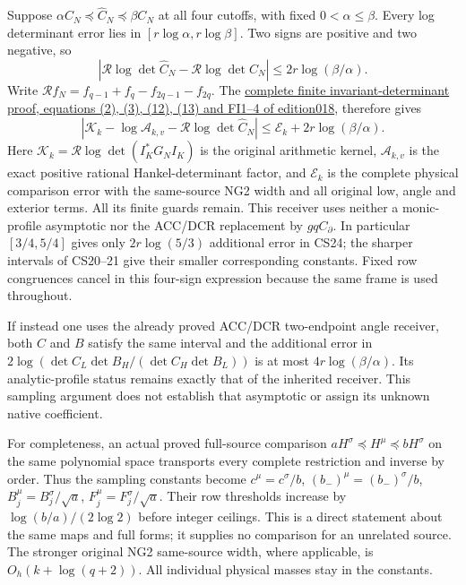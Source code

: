 \documentclass[11pt]{article}
\begin{document}
Suppose \(\alpha C_N\preceq\widehat C_N\preceq\beta C_N\) at all four cutoffs, with fixed \(0<\alpha\le\beta\). Every log determinant error lies in \([r\log\alpha,r\log\beta]\). Two signs are positive and two negative, so \[
 |\mathcal R\log\det\widehat C_N-\mathcal R\log\det C_N|
 \le2r\log(\beta/\alpha).
\] Write \(\mathcal Rf_N=f_{q-1}+f_q-f_{2q-1}-f_{2q}\). The \href{https://github.com/KokunoYumeto/zeta-function-research-reader/blob/75256b0237884bdef0074c2ac6310de1ea32ec26/workbenches/splitzero-tandem/continuations/20260921-invariant-collision/FINITE_INVARIANT_PROOFS.md}{complete finite invariant-determinant proof, equations (2), (3), (12), (13) and FI1--4 of edition018}, therefore gives \[
 \boxed{\left|\mathcal K_k-\log\mathcal A_{k,v}-\mathcal R\log\det\widehat C_N\right|
 \le\mathcal E_k+2r\log(\beta/\alpha).}
 \tag{CS24}
\] Here \(\mathcal K_k=\mathcal R\log\det(I_K^*G_NI_K)\) is the original arithmetic kernel, \(\mathcal A_{k,v}\) is the exact positive rational Hankel-determinant factor, and \(\mathcal E_k\) is the complete physical comparison error with the same-source NG2 width and all original low, angle and exterior terms. All its finite guards remain. This receiver uses neither a monic-profile asymptotic nor the ACC/DCR replacement by \(gqC_\partial\). In particular \([3/4,5/4]\) gives only \(2r\log(5/3)\) additional error in CS24; the sharper intervals of CS20--21 give their smaller corresponding constants. Fixed row congruences cancel in this four-sign expression because the same frame is used throughout.

If instead one uses the already proved ACC/DCR two-endpoint angle receiver, both \(C\) and \(B\) satisfy the same interval and the additional error in \(2\log(\det C_L\det B_H/(\det C_H\det B_L))\) is at most \(4r\log(\beta/\alpha)\). Its analytic-profile status remains exactly that of the inherited receiver. This sampling argument does not establish that asymptotic or assign its unknown native coefficient.

For completeness, an actual proved full-source comparison \(aH^\sigma\preceq H^\mu\preceq bH^\sigma\) on the same polynomial space transports every complete restriction and inverse by order. Thus the sampling constants become \(c^\mu=c^\sigma/b\), \((b_- )^\mu=(b_- )^\sigma/b\), \(B_j^\mu=B_j^\sigma/\sqrt a\), \(F_j^\mu=F_j^\sigma/\sqrt a\). Their row thresholds increase by \(\log(b/a)/(2\log2)\) before integer ceilings. This is a direct statement about the same maps and full forms; it supplies no comparison for an unrelated source. The stronger original NG2 same-source width, where applicable, is \(O_h(k+\log(q+2))\). All individual physical masses stay in the constants.
\end{document}
